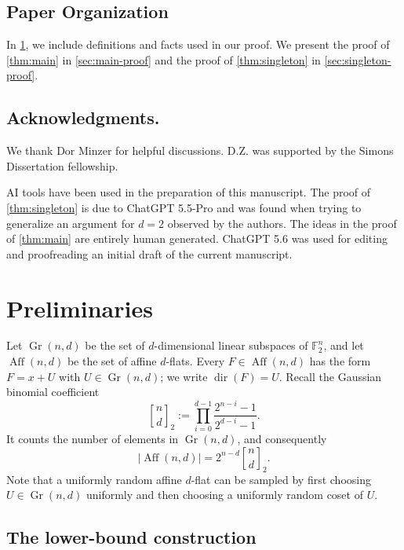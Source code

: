 \documentclass[10pt,a4paper]{amsart}
\newcommand{\F}{\mathbb F}
\newcommand{\qbinom}[2]{\genfrac{[}{]}{0pt}{}{#1}{#2}_{\!2}}
\DeclareMathOperator{\Aff}{Aff}
\DeclareMathOperator{\Gr}{Gr}
\DeclareMathOperator{\dir}{dir}
\begin{document}
\subsection{Paper Organization}
In \cref{sec:prelim}, we include definitions and facts used in our proof.  We present the proof of \cref{thm:main} in \cref{sec:main-proof} and the proof of \cref{thm:singleton} in \cref{sec:singleton-proof}.


\subsection{Acknowledgments.} We thank Dor Minzer for helpful discussions. D.Z. was supported by the Simons Dissertation fellowship.

AI tools have been used in the preparation of this manuscript. The proof of \cref{thm:singleton} is due to ChatGPT 5.5-Pro and was found when trying to generalize an argument for $d=2$ observed by the authors. The ideas in the proof of \cref{thm:main} are entirely human generated. ChatGPT 5.6 was used for editing and proofreading an initial draft of the current manuscript.


\section{Preliminaries}\label{sec:prelim}

Let $\Gr(n,d)$ be the set of $d$-dimensional linear subspaces of
$\F_2^n$, and let $\Aff(n,d)$ be the set of affine $d$-flats. Every
$F\in\Aff(n,d)$ has the form $F=x+U$ with $U\in\Gr(n,d)$; we write
$\dir(F)=U$. Recall the Gaussian binomial coefficient
\[
  \qbinom{n}{d}
  :=\prod_{i=0}^{d-1}\frac{2^{n-i}-1}{2^{d-i}-1}.
\]
It counts the number of elements in $\Gr(n,d)$, and consequently
\[
  |\Aff(n,d)|=2^{n-d}\qbinom{n}{d}.
\]
Note that a uniformly random affine $d$-flat can be sampled by first choosing
$U\in\Gr(n,d)$ uniformly and then choosing a uniformly random coset of
$U$.


\subsection{The lower-bound construction}
\end{document}
